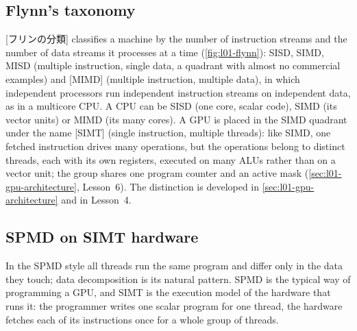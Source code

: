 \documentclass[../main.tex]{subfiles}
\begin{document}
\subsection{Flynn's taxonomy}

\begin{marginfigure}
  \resizebox{\linewidth}{!}{}
  \caption{Flynn's taxonomy.  GPUs sit in the single-instruction,
    multiple-data quadrant as SIMT.}
  \label{fig:l01-flynn}
\end{marginfigure}

[フリンの分類] classifies a machine by the number
of instruction streams and the number of data streams it processes at a
time (\cref{fig:l01-flynn}): SISD, SIMD, MISD (multiple instruction,
single data, a quadrant with almost no commercial examples) and
[MIMD] (multiple instruction, multiple data), in which
independent processors run independent instruction streams on
independent data, as in a multicore CPU.  A CPU can be SISD (one core, scalar code),
SIMD (its vector units) or MIMD (its many cores).  A GPU is placed in
the SIMD quadrant under the name [SIMT] (single instruction,
multiple threads): like SIMD, one fetched instruction drives many
operations, but the operations belong to distinct threads, each with its
own registers, executed on many ALUs rather than on a vector unit; the
group shares one program counter and an active mask
(\cref{sec:l01-gpu-architecture}, Lesson~6).  The distinction is
developed in \cref{sec:l01-gpu-architecture} and in
Lesson~4.

\subsection{SPMD on SIMT hardware}

In the SPMD style all threads run the same program and differ only in
the data they touch; data decomposition is its natural pattern.  SPMD is
the typical way of programming a GPU, and SIMT is the execution model of
the hardware that runs it: the programmer writes one scalar program for
one thread, the hardware fetches each of its instructions once for a
whole group of threads.
\end{document}
